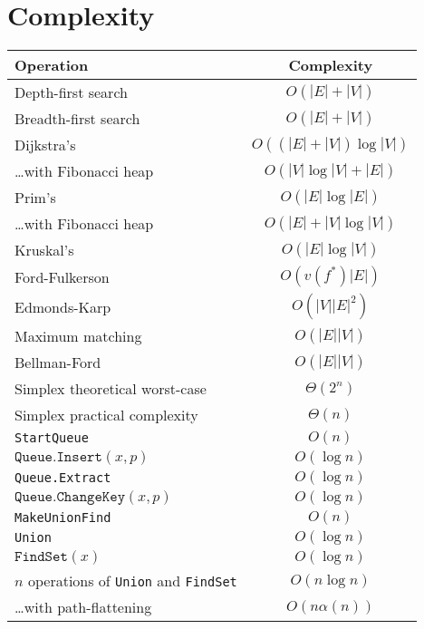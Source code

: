\documentclass[twocolumn,a4paper,8pt]{extarticle}
\begin{document}
\section{Complexity}

\begin{tabular}{|l|c|}
  \hline
  Operation & Complexity \\
  \hline
  Depth-first search & \(O(|E| + |V|)\)\\
  Breadth-first search & \(O(|E| + |V|)\)\\
  Dijkstra's & \(O((|E| + |V|)\log|V|)\)\\
  \dots with Fibonacci heap & \(O(|V|\log |V| + |E|)\)\\
  Prim's & \(O(|E|\log|E|)\)\\
  \dots with Fibonacci heap & \(O(|E| + |V|\log |V|)\)\\
  Kruskal's & \(O(|E|\log|V|)\)\\
  Ford-Fulkerson & \(O(v(f^*)|E|)\)\\
  Edmonds-Karp & \(O(|V||E|^2)\)\\
  Maximum matching & \(O(|E||V|)\)\\
  Bellman-Ford & \(O(|E||V|)\)\\
  Simplex theoretical worst-case & \(\Theta(2^n)\)\\
  Simplex practical complexity & \(\Theta(n)\)\\
  \hline
  \texttt{StartQueue} & \(O(n)\)\\
  \(\texttt{Queue.Insert}(x, p)\) & \(O(\log n)\)\\
  \texttt{Queue.Extract} & \(O(\log n)\)\\
  \(\texttt{Queue.ChangeKey}(x, p)\) & \(O(\log n)\)\\
  \hline
  \texttt{MakeUnionFind} & \(O(n)\)\\
  \texttt{Union} & \(O(\log n)\)\\
  \(\texttt{FindSet}(x)\) & \(O(\log n)\)\\
  \(n\) operations of \texttt{Union} and \texttt{FindSet} & \(O(n\log
  n)\)\\
  \dots with path-flattening & \(O(n \alpha(n))\)\\
  \hline
\end{tabular}
\end{document}
